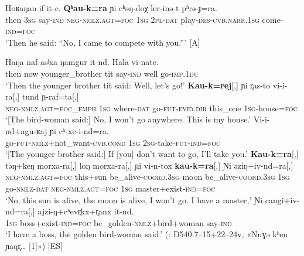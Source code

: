 \documentclass[output=paper,colorlinks,citecolor=brown]{langscibook}
\begin{document}
\ea\label{ex:niv:114}
    \gll Hoʁaŋan if it-c. \textbf{Qʰau-k=ra} ɲi cʰəŋ-doχ ler-inə-t pʰrə-ɟ=ra. \\ 
         then \textsc{3sg} say-\textsc{ind} \textsc{neg}{}-\textsc{nmlz.agt}=\textsc{foc} \textsc{1sg} 2\textsc{pl-dat} play-\textsc{des-cvb.narr.1sg} come-\textsc{ind=foc} \\
    \glt ‘Then he said: “No, I came to compete with you.”’ \citep[229]{Panfilov1965} [A]
\z 


\ea\label{ex:niv:115}
    \gll Haŋa naf asʲxa ŋamgur it-nd. Hala vi-nate. \\ 
        then now younger\_brother tit say-\textsc{ind} well go-\textsc{imp.1du}\\
    \glt ‘Then the younger brother tit said: Well, let’s go!’  \medskip\newline
    \gll \textbf{Kau-k=rej}[,] ɲi r̥as-to vi-i-ra[,] tund ɲ-raf=ta[.]\\ 
        \textsc{neg-nmlz.agt=foc\_emph} \textsc{1sg} where-\textsc{dat} go-\textsc{fut-evid.dir} this\_one \textsc{1sg}{}-house=\textsc{foc}\\
    \glt ‘[The bird-woman said:] No, I won’t go anywhere. This is my house.’ \medskip\newline
    \gll  Vi-i-nd+agu-ʁaj ɲi cʰ-xe-i-nd=ra. \\ 
         go-\textsc{fut-nmlz}+not\_want-\textsc{cvb.cond} \textsc{1sg} \textsc{2sg-}take-\textsc{fut-ind=foc}\\
    \glt ‘[The younger brother said:] If [you] don’t want to go, I’ll take you.’ \medskip\newline
    \gll \textbf{Kau-k=ra}[,] təŋ+keŋ morxa-ra[,] loŋ morxa-ra[,] ɲi vi-n-tox \textbf{kau-k=ra}[.] Ɲi əziŋ+iv-nd=ra[,]\\ 
        \textsc{neg-nmlz.agt=foc} this+sun be\_alive-\textsc{coord.3sg} moon be\_alive-\textsc{coord.3sg} \textsc{1sg} go-\textsc{nmlz}{}-\textsc{dat} \textsc{neg-nmlz.agt=foc} \textsc{1sg} master+exist-\textsc{ind=foc} \\
    \glt ‘No, this sun is alive, the moon is alive, I won’t go. I have a master,’   \medskip\newline 
    \gll Ɲi cangi+iv-nd=ra[,] ajzi-ŋ+cʰevr̥kx+r̥anx it-nd. \\ 
         \textsc{1sg} boss+exist\textsc{{}-ind=foc} be\_golden-\textsc{nmlz}+bird+woman say-\textsc{ind} \\
    \glt ‘I have a boss, the golden bird-woman said.’ (\cite{KreinovichMs}: D540:7–15+22–24v, «Nuɣə kʰen ɲaqr̥… [1]») [ES]
\z
\end{document}
